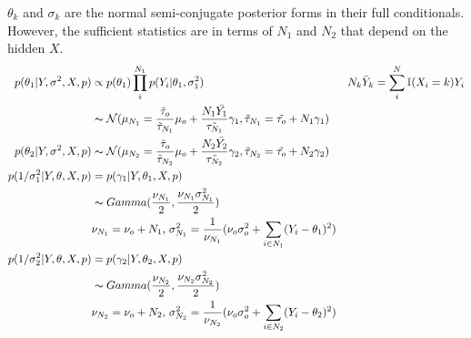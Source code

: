 \documentclass[11pt, letterpaper]{article}
\begin{document}
$\theta_k$ and $\sigma_k$ are the normal semi-conjugate posterior forms in their full conditionals. However, the sufficient statistics are in terms of $N_1$ and $N_2$ that depend on the hidden $X$.
\begin{align*}
    p(\theta_1|Y, \sigma^2, X, p)
        &\propto p(\theta_1) \prod_i^{N_1} p(Y_i|\theta_1, \sigma^2_1) 
            && N_k \bar{Y}_k = \sum_i^N \mathbb{I}(X_i=k) Y_i \\
        &\thicksim \mathcal{N}(
            \mu_{N_1} = 
                \frac{\tilde{\tau}_o}{\tilde{\tau}_{N_1}} \mu_o + \frac{N_1\bar{Y_1}}{\tilde{\tau_{N_1}}}\gamma_1,
            \tilde{\tau}_{N_1} = \tilde{\tau_o} + N_1\gamma_1
        ) \\
    p(\theta_2|Y, \sigma^2, X, p)
        &\thicksim \mathcal{N}(
            \mu_{N_2} = 
                \frac{\tilde{\tau}_o}{\tilde{\tau}_{N_2}} \mu_o + \frac{N_2\bar{Y_2}}{\tilde{\tau_{N_2}}}\gamma_2,
            \tilde{\tau}_{N_2} = \tilde{\tau_o} + N_2\gamma_2
        ) \\
    p(1/\sigma_1^2|Y, \theta, X, p) &= p(\gamma_1|Y, \theta_1, X, p) \\
        &\thicksim Gamma(\frac{\nu_{N_1}}{2}, \frac{\nu_{N_1}\sigma_{N_1}^2}{2}) \\
        &\nu_{N_1} = \nu_o + N_1, \, \sigma_{N_1}^2 = \frac{1}{\nu_{N_1}}(\nu_o\sigma_o^2+\sum_{i\in N_1}(Y_i-\theta_1)^2) \\
    p(1/\sigma_2^2|Y, \theta, X, p) &= p(\gamma_2|Y, \theta_2, X, p) \\
        &\thicksim Gamma(\frac{\nu_{N_2}}{2}, \frac{\nu_{N_2}\sigma_{N_2}^2}{2}) \\
        &\nu_{N_2} = \nu_o + N_2, \, \sigma_{N_2}^2 = \frac{1}{\nu_{N_2}}(\nu_o\sigma_o^2+\sum_{i\in N_2}(Y_i-\theta_2)^2) \\
\end{align*}
\end{document}
